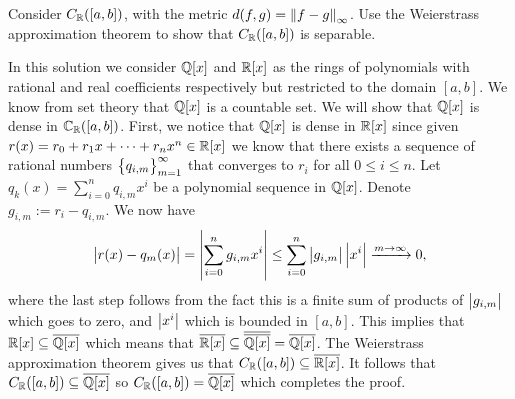 \documentclass[11pt,a4paper]{article}
\begin{document}
\begin{exercise}
  Consider $C_{\mathbb{R}}([a,b])$, with the metric $d(f,g) = \left\lVert f - g\right\rVert_{\infty}$.
  Use the Weierstrass approximation theorem to show
  that $C_{\mathbb{R}}([a,b])$ is separable.
\end{exercise}
\begin{solution}
  In this solution we consider $\mathbb{Q}[x]$ and $\mathbb{R}[x]$ as the rings of polynomials
  with rational and real coefficients respectively but restricted
  to the domain $[a,b]$.
  We know from set theory that $\mathbb{Q}[x]$ is a countable set.
  We will show that $\mathbb{Q}[x]$ is dense in $\mathbb{C}_{\mathbb{R}}([a,b])$.
  First, we notice that $\mathbb{Q}[x]$ is dense in $\mathbb{R}[x]$ since
  given $r(x) = r_0 + r_1 x + \cdots + r_n x^n \in \mathbb{R}[x]$ we know
  that there exists a sequence of rational numbers
  $\left\{q_{i,m}\right\}_{m=1}^{\infty}$ that converges to $r_i$ for all
  $0 \le i \le n$.
  Let $q_k(x) = \sum_{i=0}^{n} q_{i,m} x^i$ be a polynomial sequence in $\mathbb{Q}[x]$.
  Denote $g_{i,m} := r_i - q_{i,m}$.
  We now have
  \[
    \left\lvert r(x) - q_m(x)\right\rvert =
    \left\lvert\sum_{i=0}^{n} g_{i,m} x^i\right\rvert \le
    \sum_{i=0}^{n} \left\lvert g_{i,m}\right\rvert \left\lvert x^i\right\rvert
    \xrightarrow{m \to \infty} 0,
  \]
  where the last step follows from the fact this is a finite sum
  of products of $\left\lvert g_{i,m}\right\rvert$ which goes to zero, and $\left\lvert x^i\right\rvert$
  which is bounded in $[a,b]$.
  This implies that $\mathbb{R}[x] \subseteq \overline{\mathbb{Q}[x]}$
  which means that
  $\overline{\mathbb{R}[x]} \subseteq \overline{\overline{\mathbb{Q}[x]}} = \overline{\mathbb{Q}[x]}$.
  The Weierstrass approximation theorem gives us that
  $C_{\mathbb{R}}([a,b]) \subseteq \overline{\mathbb{R}[x]}$.
  It follows that
  $C_{\mathbb{R}}([a,b]) \subseteq \overline{\mathbb{Q}[x]}$
  so $C_{\mathbb{R}}([a,b]) = \overline{\mathbb{Q}[x]}$ which completes the proof.
\end{solution}
\end{document}
